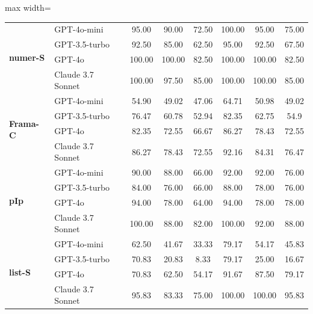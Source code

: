 \begin{table}[t]
\begin{adjustbox}{max width=\linewidth}
\begin{tabular}{ll ccc ccc}
\multirow{4}{*}{\textbf{numer-S}}
 & GPT-4o-mini & 95.00 & 90.00 & 72.50 & 100.00 & 95.00 & 75.00 \\
 & GPT-3.5-turbo & 92.50 & 85.00 & 62.50 & 95.00 & 92.50 & 67.50 \\
 & GPT-4o & 100.00 & 100.00 & 82.50 & 100.00 & 100.00 & 82.50 \\
 & Claude 3.7 Sonnet & 100.00 & 97.50 & 85.00 & 100.00 & 100.00 & 85.00 \\
\midrule

\multirow{4}{*}{\textbf{Frama-C}}
 & GPT-4o-mini & 54.90 & 49.02 & 47.06 & 64.71 & 50.98 & 49.02 \\
 & GPT-3.5-turbo & 76.47 & 60.78 & 52.94 & 82.35 & 62.75 & 54.9 \\
 & GPT-4o & 82.35 & 72.55 & 66.67 & 86.27 & 78.43 & 72.55 \\
 & Claude 3.7 Sonnet & 86.27 & 78.43 & 72.55 & 92.16 & 84.31 & 76.47 \\
\midrule

\multirow{4}{*}{\textbf{pIp}}
 & GPT-4o-mini & 90.00 & 88.00 & 66.00 & 92.00 & 92.00 & 76.00 \\
 & GPT-3.5-turbo & 84.00 & 76.00 & 66.00 & 88.00 & 78.00 & 76.00 \\
 & GPT-4o & 94.00 & 78.00 & 64.00 & 94.00 & 78.00 & 78.00 \\
 & Claude 3.7 Sonnet & 100.00 & 88.00 & 82.00 & 100.00 & 92.00 & 88.00 \\
\midrule

\multirow{4}{*}{\textbf{list-S}}
 & GPT-4o-mini & 62.50 & 41.67 & 33.33 & 79.17 & 54.17 & 45.83 \\
 & GPT-3.5-turbo & 70.83 & 20.83 & 8.33 & 79.17 & 25.00 & 16.67 \\
 & GPT-4o & 70.83 & 62.50 & 54.17 & 91.67 & 87.50 & 79.17 \\
 & Claude 3.7 Sonnet & 95.83 & 83.33 & 75.00 & 100.00 & 100.00 & 95.83 \\
\bottomrule
\end{tabular}
\end{adjustbox}
\end{table}



